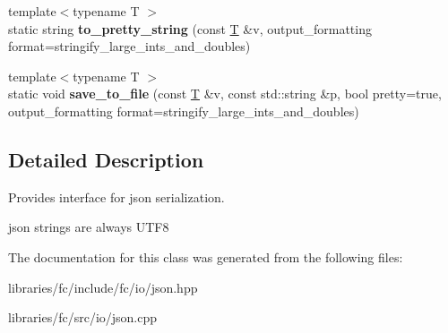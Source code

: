 \begin{DoxyCompactItemize}
\item 
\mbox{\label{classfc_1_1json_af754342dcb376bf7a4957807b5e1d3da}} 
{\footnotesize template$<$typename T $>$ }\\static string {\bfseries to\+\_\+pretty\+\_\+string} (const \mbox{\hyperlink{struct_t}{T}} \&v, output\+\_\+formatting format=stringify\+\_\+large\+\_\+ints\+\_\+and\+\_\+doubles)
\item 
\mbox{\label{classfc_1_1json_abb0829da2d2b85518510f758e8004301}} 
{\footnotesize template$<$typename T $>$ }\\static void {\bfseries save\+\_\+to\+\_\+file} (const \mbox{\hyperlink{struct_t}{T}} \&v, const std\+::string \&p, bool pretty=true, output\+\_\+formatting format=stringify\+\_\+large\+\_\+ints\+\_\+and\+\_\+doubles)
\end{DoxyCompactItemize}


\subsection{Detailed Description}
Provides interface for json serialization.

json strings are always U\+T\+F8 

The documentation for this class was generated from the following files\+:\begin{DoxyCompactItemize}
\item 
libraries/fc/include/fc/io/json.\+hpp\item 
libraries/fc/src/io/json.\+cpp\end{DoxyCompactItemize}
